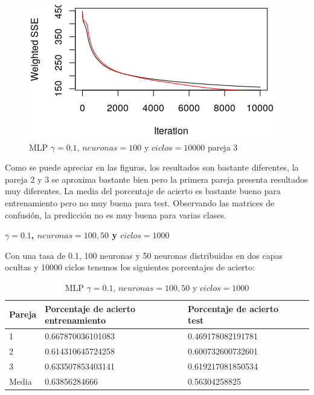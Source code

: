 \documentclass[11pt,spanish,listoffigures,listoftables]{workluis}
\begin{document}
\begin{figure}[H]
\centering
\includegraphics[scale=5]{011003}
\caption{MLP $\gamma = 0.1$, $neuronas = 100$ y $ciclos = 10000$ pareja 3}
\end{figure} 

\par Como se puede apreciar en las figuras, los resultados son bastante diferentes, la pareja 2 y 3 se aproxima bastante bien pero la primera pareja presenta resultados muy diferentes. La media del porcentaje de acierto es bastante bueno para entrenamiento pero no muy buena para test. Observando las matrices de confusión, la predicción no es muy buena para varias clases.


\par \textbf{$\gamma = 0.1$, $neuronas = 100,50$ y $ciclos = 1000$}

\par Con una tasa de 0.1, 100 neuronas y 50 neuronas distribuidas en dos capas ocultas y 10000 ciclos tenemos los siguientes porcentajes de acierto:

\begin{table}[H]
\centering
\caption{MLP $\gamma = 0.1$, $neuronas = 100,50$ y $ciclos = 1000$}
\label{tb:tb2}
\begin{tabular}{lllll}
\hline
\multicolumn{1}{|l|}{Pareja} & Porcentaje de acierto entrenamiento & Porcentaje de acierto test  \\ \hline \hline
1                            & 0.667870036101083    & 0.469178082191781 \\
2                            & 0.614310645724258    & 0.600732600732601 \\
3                            & 0.633507853403141    & 0.619217081850534 \\
Media                        & 0.63856284666        & 0.56304258825     \\ \hline
\end{tabular}
\end{table}
\end{document}
